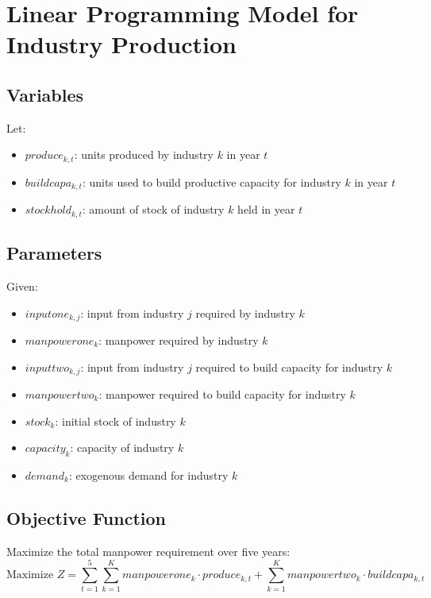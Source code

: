 \documentclass{article}
\begin{document}
\section*{Linear Programming Model for Industry Production}

\subsection*{Variables}
Let:
\begin{itemize}
    \item \( produce_{k, t} \): units produced by industry \( k \) in year \( t \)
    \item \( buildcapa_{k, t} \): units used to build productive capacity for industry \( k \) in year \( t \)
    \item \( stockhold_{k, t} \): amount of stock of industry \( k \) held in year \( t \)
\end{itemize}

\subsection*{Parameters}
Given:
\begin{itemize}
    \item \( inputone_{k, j} \): input from industry \( j \) required by industry \( k \)
    \item \( manpowerone_{k} \): manpower required by industry \( k \)
    \item \( inputtwo_{k, j} \): input from industry \( j \) required to build capacity for industry \( k \)
    \item \( manpowertwo_{k} \): manpower required to build capacity for industry \( k \)
    \item \( stock_{k} \): initial stock of industry \( k \)
    \item \( capacity_{k} \): capacity of industry \( k \)
    \item \( demand_{k} \): exogenous demand for industry \( k \)
\end{itemize}

\subsection*{Objective Function}
Maximize the total manpower requirement over five years:
\[
\text{Maximize } Z = \sum_{t=1}^{5} \sum_{k=1}^{K} manpowerone_{k} \cdot produce_{k, t} + \sum_{k=1}^{K} manpowertwo_{k} \cdot buildcapa_{k, t}
\]
\end{document}
